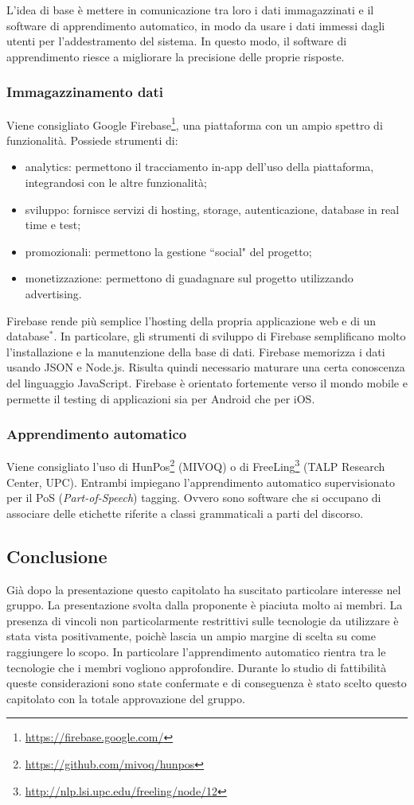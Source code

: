 \documentclass[11pt,a4paper]{article}
\begin{document}
	L'idea di base è mettere in comunicazione tra loro i dati immagazzinati e il software di apprendimento automatico, in modo da usare i dati immessi dagli utenti per l'addestramento del sistema. In questo modo, il software di apprendimento riesce a migliorare la precisione delle proprie risposte.
	\subsubsection{Immagazzinamento dati}
		Viene consigliato Google Firebase\footnote{\url{https://firebase.google.com/}}, una piattaforma con un ampio spettro di funzionalità. Possiede strumenti di:
		\begin{itemize}
			\item analytics: permettono il tracciamento in-app dell'uso della piattaforma, integrandosi con le altre funzionalità;
			\item sviluppo: fornisce servizi di hosting, storage, autenticazione, database in real time e test; 
			\item promozionali: permettono la gestione ``social" del progetto;
			\item monetizzazione: permettono di guadagnare sul progetto utilizzando advertising.
		\end{itemize}	 
	
		Firebase rende più semplice l'hosting della propria applicazione web e di un database$^*$. In particolare, gli strumenti di sviluppo di Firebase semplificano molto l'installazione e la manutenzione della base di dati. Firebase memorizza i dati usando JSON e Node.js. Risulta quindi necessario maturare una certa conoscenza del linguaggio JavaScript.
	Firebase è orientato fortemente verso il mondo mobile e permette il testing di applicazioni sia per Android che per iOS.
	
	\subsubsection{Apprendimento automatico}
		Viene consigliato l'uso di HunPos\footnote{\url{https://github.com/mivoq/hunpos}} (MIVOQ) o di FreeLing\footnote{\url{ http://nlp.lsi.upc.edu/freeling/node/12}} (TALP Research Center, UPC). Entrambi impiegano l'apprendimento automatico supervisionato per il PoS (\textit{Part-of-Speech}) tagging. Ovvero sono software che si occupano di associare delle etichette riferite a classi grammaticali a parti del discorso. 
		\subsection{Conclusione}
		Già dopo la presentazione questo capitolato ha suscitato particolare interesse nel gruppo. La presentazione svolta dalla proponente è piaciuta molto ai membri. La presenza di vincoli non particolarmente restrittivi sulle tecnologie da utilizzare è stata vista positivamente, poichè lascia un ampio margine di scelta su come raggiungere lo scopo. In particolare l'apprendimento automatico rientra tra le tecnologie che i membri vogliono approfondire. Durante lo studio di fattibilità queste considerazioni sono state confermate e di conseguenza è stato scelto questo capitolato con la totale approvazione del gruppo. 
		\newpage
\end{document}
